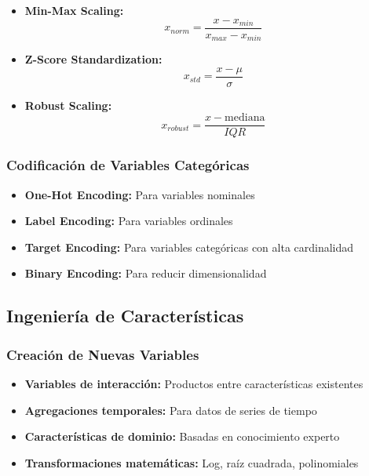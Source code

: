 \begin{itemize}
    \item \textbf{Min-Max Scaling:} 
    \begin{equation}
    x_{norm} = \frac{x - x_{min}}{x_{max} - x_{min}}
    \label{eq:minmax_scaling}
    \end{equation}
    
    \item \textbf{Z-Score Standardization:}
    \begin{equation}
    x_{std} = \frac{x - \mu}{\sigma}
    \label{eq:zscore_scaling}
    \end{equation}
    
    \item \textbf{Robust Scaling:}
    \begin{equation}
    x_{robust} = \frac{x - \text{mediana}}{IQR}
    \label{eq:robust_scaling}
    \end{equation}
\end{itemize}

\subsubsection{Codificación de Variables Categóricas}

\begin{itemize}
    \item \textbf{One-Hot Encoding:} Para variables nominales
    \item \textbf{Label Encoding:} Para variables ordinales
    \item \textbf{Target Encoding:} Para variables categóricas con alta cardinalidad
    \item \textbf{Binary Encoding:} Para reducir dimensionalidad
\end{itemize}

\subsection{Ingeniería de Características}

\subsubsection{Creación de Nuevas Variables}

\begin{itemize}
    \item \textbf{Variables de interacción:} Productos entre características existentes
    \item \textbf{Agregaciones temporales:} Para datos de series de tiempo
    \item \textbf{Características de dominio:} Basadas en conocimiento experto
    \item \textbf{Transformaciones matemáticas:} Log, raíz cuadrada, polinomiales
\end{itemize}

